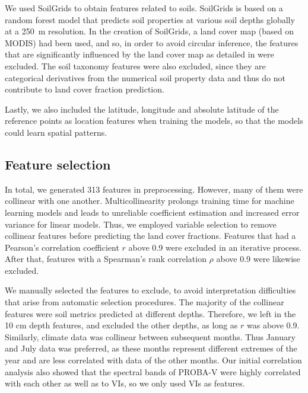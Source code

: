 \documentclass[review,authoryear,3p]{elsarticle}
\begin{document}
We used SoilGrids \citep{hengl_soilgrids250m_2017} to obtain features related to soils.
SoilGrids is based on a random forest model that predicts soil properties at various soil depths globally at a 250~m resolution.
In the creation of SoilGrids, a land cover map (based on MODIS) had been used, and so, in order to avoid circular inference, the features that are significantly influenced by the land cover map as detailed in \citet{hengl_soilgrids250m_2017} were excluded.
The soil taxonomy features were also excluded, since they are categorical derivatives from the numerical soil property data and thus do not contribute to land cover fraction prediction.

Lastly, we also included the latitude, longitude and absolute latitude of the reference points as location features when training the models, so that the models could learn spatial patterns.

\subsection{Feature selection}
\label{sec-covariate-selection}

In total, we generated 313 features in preprocessing.
However, many of them were collinear with one another.
Multicollinearity prolongs training time for machine learning models and leads to unreliable coefficient estimation and increased error variance for linear models.
Thus, we employed variable selection to remove collinear features before predicting the land cover fractions.
Features that had a Pearson's correlation coefficient $r$ \citep{pearson_notes_1895} above 0.9 were excluded in an iterative process.
After that, features with a Spearman's rank correlation $\rho$ \citep{spearman1904rank} above 0.9 were likewise excluded.

We manually selected the features to exclude, to avoid interpretation difficulties that arise from automatic selection procedures.
The majority of the collinear features were soil metrics predicted at different depths.
Therefore, we left in the 10 cm depth features, and excluded the other depths, as long as $r$ was above 0.9.
Similarly, climate data was collinear between subsequent months. Thus January and July data was preferred, as these months represent different extremes of the year and are less correlated with data of the other months.
Our initial correlation analysis also showed that the spectral bands of PROBA-V were highly correlated with each other as well as to \glspl{VI}, so we only used \glspl{VI} as features.
\end{document}
